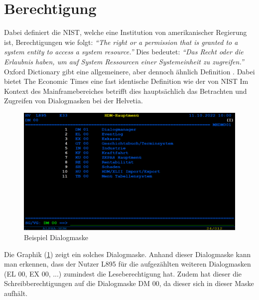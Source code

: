 \section{Berechtigung}
\label{sec:Berechtigung}
Dabei definiert die \ac{NIST}, welche eine Institution von amerikanischer Regierung ist, Berechtigungen wie folgt:
\newline
\newline
\textit{"`The right or a permission that is granted to a system entity to access a system resource."'} \cite{Auth}
\newline
\newline
Dies bedeutet:
\newline
\newline
\textit{"`Das Recht oder die Erlaubnis haben, um auf System Ressourcen einer Systemeinheit zu zugreifen."'} \cite{Auth}
\newline
\newline
Oxford Dictionary gibt eine allgemeinere, aber dennoch ähnlich Definition \cite{AuthOx}.
Dabei bietet The Economic Times eine fast identische Definition wie der von \ac{NIST} \cite{AuthEco}
Im Kontext des Mainframebereiches betrifft dies hauptsächlich das Betrachten und Zugreifen von Dialogmasken bei der Helvetia.
\begin{figure}[h!]
 \centering
 \includegraphics[width=1\textwidth]{gfx/Picture/Dialog.PNG}
 \caption{Beispiel Dialogmaske}
 \label{fig:Dial}
\end{figure}
Die Graphik (\ref{fig:Dial}) zeigt ein solches Dialogmaske.
Anhand dieser Dialogmaske kann man erkennen, dass der Nutzer L895 für die aufgezählten weiteren Dialogmasken (EL 00, EX 00, ...) zumindest die Leseberechtigung hat.
Zudem hat dieser die Schreibberechtigungen auf die Dialogmaske DM 00, da dieser sich in dieser Maske aufhält. 
\newline

